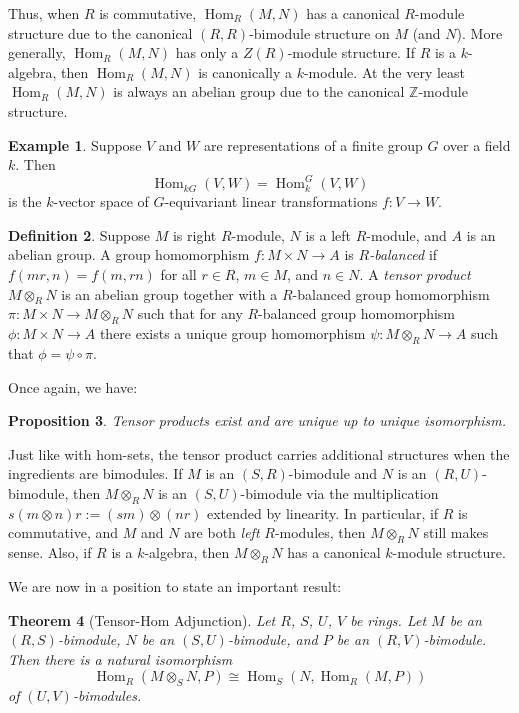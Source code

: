 \documentclass[12pt]{article}
\theoremstyle{plain}
\newtheorem{theorem}{Theorem}[section]
\newtheorem{proposition}[theorem]{Proposition}
\theoremstyle{definition}
\newtheorem{definition}[theorem]{Definition}
\newtheorem{example}[theorem]{Example}
\theoremstyle{remark}
\numberwithin{equation}{section}
\begin{document}
Thus, when $R$ is commutative, $\operatorname{Hom}_R(M,N)$
has a canonical $R$-module structure due to the canonical
$(R,R)$-bimodule structure on $M$ (and $N$).
More generally, $\operatorname{Hom}_R(M,N)$ has only a $Z(R)$-module
structure.
If $R$ is a $k$-algebra, then $\operatorname{Hom}_R(M,N)$
is canonically a $k$-module.
At the very least $\operatorname{Hom}_R(M,N)$ is always an
abelian group due to the canonical $\mathbb{Z}$-module structure.

\begin{example}
Suppose $V$ and $W$ are representations of a finite group $G$
over a field $k$.
Then
\[
\operatorname{Hom}_{kG}(V,W) = \operatorname{Hom}^G_k(V,W)
\]
is the $k$-vector space of $G$-equivariant linear transformations
$f : V \to W$.
\end{example}

\begin{definition}
Suppose $M$ is right $R$-module, $N$ is a left $R$-module,
and $A$ is an abelian group.
A group homomorphism $f: M \times N \to A$ is \emph{$R$-balanced}
if $f(mr,n)=f(m,rn)$ for all $r \in R$, $m \in M$, and $n \in N$.
A \emph{tensor product} $M \otimes_R N$ is an abelian group
together with a $R$-balanced group homomorphism
$\pi : M \times N \to M \otimes_R N$ such that
for any $R$-balanced group homomorphism
$\phi : M \times N \to A$ there exists a unique
group homomorphism $\psi :  M \otimes_R N \to A$
such that $\phi = \psi \circ \pi$.
\end{definition}

Once again, we have:

\begin{proposition}
Tensor products exist and are unique up to unique isomorphism.
\end{proposition}

Just like with hom-sets, the tensor product carries additional
structures when the ingredients are bimodules.
If $M$ is an $(S,R)$-bimodule and $N$ is an $(R,U)$-bimodule,
then $M \otimes_R N$ is an $(S,U)$-bimodule via the multiplication
$s(m\otimes n)r := (sm) \otimes (nr)$ extended by linearity.
In particular, if $R$ is commutative, and $M$ and $N$ are both
\emph{left} $R$-modules, then $M \otimes_R N$ still makes sense.
Also, if $R$ is a $k$-algebra, then $M \otimes_R N$
has a canonical $k$-module structure.

We are now in a position to state an important result:

\begin{theorem}[Tensor-Hom Adjunction]
Let $R$, $S$, $U$, $V$ be rings.
Let $M$ be an $(R,S)$-bimodule, $N$ be an $(S,U)$-bimodule,
and $P$ be an $(R,V)$-bimodule.
Then there is a natural isomorphism
\[
\operatorname{Hom}_R(M \otimes_S N,P)
\cong \operatorname{Hom}_S(N,\operatorname{Hom}_R(M,P))
\]
 of $(U,V)$-bimodules.
\end{theorem}
\end{document}
